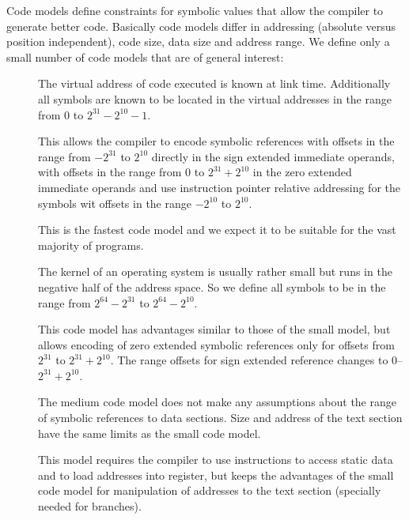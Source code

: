 Code models define constraints for symbolic values that allow the
compiler to generate better code.  Basically code models differ in
addressing (absolute versus position independent), code size, data
size and address range.  We define only a small number of code models
that are of general interest:

\begin{description}
\item[] 
  The virtual address of code executed is known at link time.
  Additionally all symbols are known to be located in the virtual
  addresses in the range from $0$ to $2^{31}-2^{10} - 1$.
  
  This allows the compiler to encode symbolic references with offsets
  in the range from $-2^{31}$ to $2^{10}$ directly in the sign
  extended immediate operands, with offsets in the range from $0$ to
  $2^{31}+2^{10}$ in the zero extended immediate operands and use
  instruction pointer relative addressing for the symbols wit offsets
  in the range $-2^{10}$ to $2^{10}$.
  
  This is the fastest code model and we expect it to be suitable for
  the vast majority of programs.

\item[]
  
  The kernel of an operating system is usually rather small but runs
  in the negative half of the address space.  So we define all symbols
  to be in the range from $2^{64}-2^{31}$ to $2^{64}-2^{10}$.
  
  This code model has advantages similar to those of the small model,
  but allows encoding of zero extended symbolic references only for
  offsets from $2^{31}$ to $2^{31}+2^{10}$. The range offsets for
  sign extended reference changes to $0$--$2^{31}+2^{10}$.

\item[]
  
  The medium code model does not make any assumptions about the range
  of symbolic references to data sections. Size and address of the
  text section have the same limits as the small code model.
  
  This model requires the compiler to use  instructions
  to access static data and to load addresses into register, but keeps
  the advantages of the small code model for manipulation of addresses
  to the text section (specially needed for branches).


\end{description}
